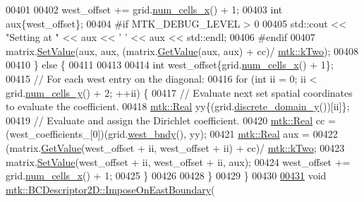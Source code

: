 \begin{DoxyCode}
00401 
00402     west\_offset += grid.\hyperlink{classmtk_1_1UniStgGrid2D_a2d182866a398aba8e4829590e85bf939}{num\_cells\_x}() + 1;
00403     \textcolor{keywordtype}{int} aux\{west\_offset\};
00404 \textcolor{preprocessor}{    #if MTK\_DEBUG\_LEVEL > 0}
00405     std::cout << \textcolor{stringliteral}{"Setting at "} << aux << \textcolor{charliteral}{' '} << aux << std::endl;
00406 \textcolor{preprocessor}{    #endif}
00407     matrix.\hyperlink{classmtk_1_1DenseMatrix_a784ce5784109ac86bfb9d8562b334b13}{SetValue}(aux, aux, (matrix.\hyperlink{classmtk_1_1DenseMatrix_a4b23ecbebd970b5eea915dbb50691024}{GetValue}(aux, aux) + cc)/
      \hyperlink{group__c01-roots_gaf39c2d851a2db744f4feb1c5ab3ec2cf}{mtk::kTwo});
00408 
00410   \} \textcolor{keywordflow}{else} \{
00411 
00413 
00414     \textcolor{keywordtype}{int} west\_offset\{grid.\hyperlink{classmtk_1_1UniStgGrid2D_a2d182866a398aba8e4829590e85bf939}{num\_cells\_x}() + 1\};
00415     \textcolor{comment}{// For each west entry on the diagonal:}
00416     \textcolor{keywordflow}{for} (\textcolor{keywordtype}{int} ii = 0; ii < grid.\hyperlink{classmtk_1_1UniStgGrid2D_aed05a801cc9a76dba0ff203cea58a61a}{num\_cells\_y}() + 2; ++ii) \{
00417       \textcolor{comment}{// Evaluate next set spatial coordinates to evaluate the coefficient.}
00418       \hyperlink{group__c01-roots_gac080bbbf5cbb5502c9f00405f894857d}{mtk::Real} yy\{(grid.\hyperlink{classmtk_1_1UniStgGrid2D_ac33a58d65105550dcf6f6b92b48b5105}{discrete\_domain\_y}())[ii]\};
00419       \textcolor{comment}{// Evaluate and assign the Dirichlet coefficient.}
00420       \hyperlink{group__c01-roots_gac080bbbf5cbb5502c9f00405f894857d}{mtk::Real} cc = (west\_coefficients\_[0])(grid.\hyperlink{classmtk_1_1UniStgGrid2D_af2b1712387ded85edaf2b64617d3fc13}{west\_bndy}(), yy);
00421       \hyperlink{group__c01-roots_gac080bbbf5cbb5502c9f00405f894857d}{mtk::Real} aux =
00422         (matrix.\hyperlink{classmtk_1_1DenseMatrix_a4b23ecbebd970b5eea915dbb50691024}{GetValue}(west\_offset + ii, west\_offset + ii) + cc)/
      \hyperlink{group__c01-roots_gaf39c2d851a2db744f4feb1c5ab3ec2cf}{mtk::kTwo};
00423       matrix.\hyperlink{classmtk_1_1DenseMatrix_a784ce5784109ac86bfb9d8562b334b13}{SetValue}(west\_offset + ii, west\_offset + ii, aux);
00424       west\_offset += grid.\hyperlink{classmtk_1_1UniStgGrid2D_a2d182866a398aba8e4829590e85bf939}{num\_cells\_x}() + 1;
00425     \}
00426 
00428   \}
00429 \}
00430 
\hypertarget{mtk__bc__descriptor__2d_8cc_source_l00431}{}\hyperlink{classmtk_1_1BCDescriptor2D_a3cf921884f08bf2eb87af6db7cc1ecba}{00431} \textcolor{keywordtype}{void} \hyperlink{classmtk_1_1BCDescriptor2D_a3cf921884f08bf2eb87af6db7cc1ecba}{mtk::BCDescriptor2D::ImposeOnEastBoundary}(

\end{DoxyCode}
